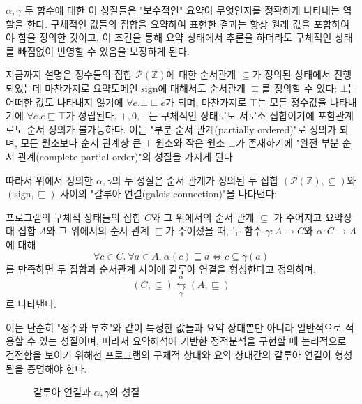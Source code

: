 \documentclass[a4paper,12pt]{article}
\begin{document}
$\alpha, \gamma$ 두 함수에 대한 이 성질들은 "보수적인" 요약이 무엇인지를 정확하게 나타내는 역할을 한다. 
구체적인 값들의 집합을 요약하여 표현한 결과는 항상 원래 값을 포함하여야 함을 정의한 것이고, 이 조건을 통해 요약 상태에서 추론을 하더라도 구체적인 상태를 빠짐없이 반영할 수 있음을 보장하게 된다.

지금까지 설명은 정수들의 집합 $\mathcal{P}(\mathbb{Z})$에 대한 순서관계 $\subseteq$가 정의된 상태에서 진행되었는데 마찬가지로 요약도메인 $\mathrm{sign}$에 대해서도 순서관계 $\sqsubseteq$를 정의할 수 있다:
$\bot$는 어떠한 값도 나타내지 않기에 $\forall e. \bot \sqsubseteq e$가 되며, 마찬가지로 $\top$는 모든 정수값을 나타내기에 $\forall e. e \sqsubseteq \top$가 성립된다. $+, 0, -$는 구체적인 상태로도 서로소 집합이기에 포함관계로도 순서 정의가 불가능하다.
이는 "부분 순서 관계(partially ordered)"로 정의가 되며, 모든 원소보다 순서 관계상 큰 $\top$ 원소와 작은 원소 $\bot$가 존재하기에 "완전 부분 순서 관계(complete partial order)"의 성질을 가지게 된다.

따라서 위에서 정의한 $\alpha, \gamma$의 두 성질은 순서 관계가 정의된 두 집합 $(\mathcal{P}(\mathbb{Z}), \subseteq)$와 $(\mathrm{sign}, \sqsubseteq)$ 사이의 "갈루아 연결(galois connection)"을 나타낸다:
\begin{udefinition}
	프로그램의 구체적 상태들의 집합 $C$와 그 위에서의 순서 관계 $\subseteq$ 가 주어지고 요약상태 집합 $A$와 그 위에서의 순서 관계 $\sqsubseteq$가 주어졌을 때,
    두 함수 $\gamma : A \rightarrow C$와 $\alpha : C \rightarrow A$ 에 대해
    $$
    \forall c \in C. \ \forall a \in A. \ \alpha(c) \sqsubseteq a \iff c \subseteq \gamma(a)
    $$
    를 만족하면 두 집합과 순서관계 사이에 갈루아 연결을 형성한다고 정의하며, 
    $$
    (C, \subseteq) \underset{\gamma}{\overset{\alpha}{\leftrightarrows}} (A, \sqsubseteq)
    $$
    로 나타낸다.\cite{cousot2021}\cite{rival2020}
\end{udefinition}

이는 단순히 "정수와 부호"와 같이 특정한 값들과 요약 상태뿐만 아니라 일반적으로 적용할 수 있는 성질이며, 따라서 요약해석에 기반한 정적분석을 구현할 때 논리적으로 건전함을 보이기 위해선 프로그램의 구체적 상태와
요약 상태간의 갈루아 연결이 형성됨을 증명해야 한다.

\begin{figure}[h]
    \centering
    \resizebox{0.9\linewidth}{!}{
        
    }
    \caption{갈루아 연결과 $\alpha, \gamma$의 성질}
    \label{fig:galois_property}
\end{figure}
\end{document}

